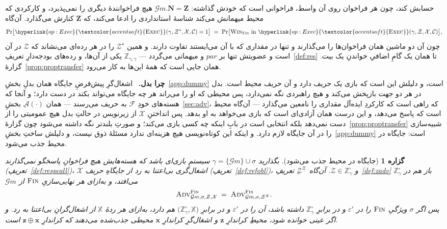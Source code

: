 \documentclass[10pt,oneside,openany]{book}
\newcommand{\admits}{\mathbf{N}}
\newcommand{\Zpid}{\mathbf{Z}}
\newcommand{\pars}{\mathit{par}}
\newcommand{\Corr}{\mathcal{C}}
\newcommand{\F}{\mathcal{F}}
\newcommand{\Zenv}{\mathcal{Z}}
\newcommand{\Adv}{\mathcal{A}}
\newcommand{\bd}[1]{\mathbf{#1}}
\newcommand{\advtg}{\op{Adv}}
\newcommand{\padv}[2]{\advtg^{#1}_{#2}}
\newcommand{\ZenvSet}{\mathbb{Z}}
\newcommand{\op}[1]{\textnormal{\textsc{#1}}}
\newcommand{\opl}[1]{\hyperlink{op:#1}{\textcolor{accentsoft}{\op{#1}}}}
\newcommand{\Gm}{\mathcal{G}m}
\newcommand{\Xset}{\mathbb{X}}
\newcommand{\Win}{\op{Win}}
\newcommand{\heading}[1]{\medskip\par\noindent\textcolor{accent}{\textbf{#1.}}\ }
\theoremstyle{accentdef}
\theoremstyle{accentplain}
\newtheorem{proposition}[definition]{گزاره}
\begin{document}
حسابش کند، چون هر فراخوان روی آن واسط، فراخوانی است که خودش گذاشته:
$\Gm.\admits = \Zpid$ هیچ فراخوانندهٔ دیگری را نمی‌پذیرد، و کارکردی که محیط
میهمانش می‌کند شناسهٔ استانداردی را ادعا می‌کند، که $\Zpid$ کنارش
می‌گذارد. آن‌گاه
\[
  \Pr\bigl[\opl{Exec}(\gamma,\Zenv^{\star},\mathcal{X},\Corr) = 1\bigr]
  \;=\;
  \Pr\bigl[\Win_{\op{Fin}} \ \text{in} \ \opl{Exec}(\gamma,\Zenv,\mathcal{X},\Corr)\bigr] ,
\]
چون آن دو ماشین همان فراخوان‌ها را می‌گذارند و تنها در مقداری که با آن
می‌ایستند تفاوت دارند. و همین $\Zenv^{\star}$ را در هر رده‌ای می‌نشاند که
$\Zenv$ در آن است و عضویتش تنها بر $\pars$ و میهمانی می‌گردد ---
$\ZenvSet_{\gamma,\gamma}$ یکی از آن‌ها، و رده‌های بودجه‌دارِ
تعریفِ~\ref{def:res} تا همان یک گامِ اضافیِ خواندنِ یک بیت.
گزارهٔ~\ref{prop:proptransfer} همان جایی است که همهٔ این‌ها به کار می‌رود.

\heading{چرا بدل} اشغال‌گرِ پیش‌فرضِ جایگاه همان بدلِ بخشِ~\ref{app:dummy}
است، و دلیلش این است که بازی یک حریف دارد و آن حریف محیط است. بدل در هر دو
جهت بازپخش می‌کند و هیچ راهبردی نگه نمی‌دارد، پس محیطی که او را می‌راند هر
چه جایگاه می‌تواند بکند در دست دارد؛ و آنجا که هسته‌های خودِ $\F$ به حریف
می‌رسند --- همان $\Adv(\cdot)$ِ بخشِ~\ref{sec:adv}، که راهی است که کارکردِ
ایده‌آل مقداری را نامعین می‌گذارد --- آن‌گاه محیط است که پاسخ می‌دهد، و این
درست همان آزادی‌ای است که بازی می‌خواهد به او بدهد. پس انداختنِ
$\mathcal{X}$ از زیرنویس در حالتِ بدل هیچ عمومیتی را از دست نمی‌دهد بلکه
انتخابی است در بابِ اینکه چه کسی بازی می‌کند؛ و صورتِ بلندتر نگه داشته
می‌شود چون گزارهٔ~\ref{prop:proptransfer} شبیه‌سازی را در آن جایگاه لازم
دارد. و اینکه این کوتاه‌نویسی هیچ هزینه‌ای ندارد مسئلهٔ ذوق نیست، و دلیلش
ساختِ بخشِ~\ref{app:dummy} است: جایگاه در محیط جذب می‌شود.

\begin{proposition}[جایگاه در محیط جذب می‌شود]\label{prop:propslotabs}
بگذارید $\gamma = \{\Gm\} \cup \sigma$ سیستمِ بازی‌ای باشد که هسته‌هایش
هیچ فراخوانِ پاسخگو نمی‌گذارند (تعریفِ~\ref{def:respcall})، $\mathcal{X}$
اشغال‌گری بی‌اعتنا به رد از جایگاهِ حریف (تعریفِ~\ref{def:refobl})، و
$\Zenv \in \ZenvSet^{\circ}_{\gamma}$. آن‌گاه $\Zenv^{\mathcal{X}}$ِ
تعریفِ~\ref{def:zadv} باز هم در $\ZenvSet^{\circ}_{\gamma}$ می‌افتد، و
به‌ازای هر نهایی‌سازیِ $\op{Fin}$ از $\Gm$
\[
  \padv{\op{Fin}}{\Gm,\sigma,\Zenv,\mathcal{X}}
  \;=\;
  \padv{\op{Fin}}{\Gm,\sigma,\Zenv^{\mathcal{X}}} .
\]
پس اگر $\sigma$ ویژگیِ $\op{Fin}$ را در $\varepsilon'$ و در برابرِ
$\ZenvSet^{\circ}_{\gamma}$ داشته باشد، آن را در $\varepsilon'$ و در برابرِ
$\bigl(\ZenvSet^{\circ}_{\gamma},\Xset\bigr)$ هم دارد، به‌ازای هر ردهٔ
$\Xset$ از اشغال‌گرانِ بی‌اعتنا به رد. و اگر عینی خوانده شود، محیطِ
کراندارِ $\bd{z}$ و اشغال‌گرِ کراندارِ $\bd{x}$ محیطی جذب‌شده می‌دهند که
کراندارِ $\bd{z} \oplus \bd{x}$ است.
\end{proposition}
\end{document}
